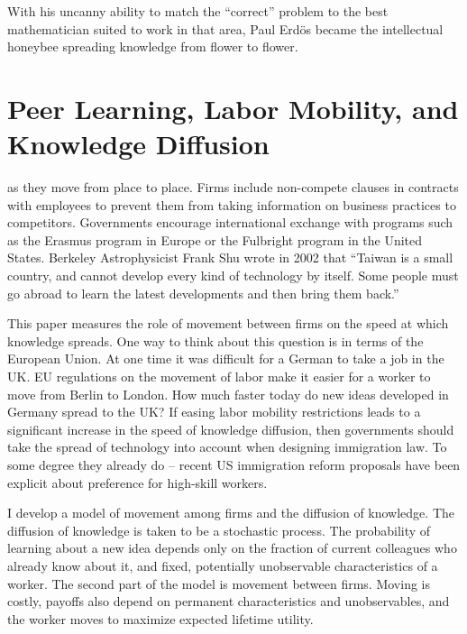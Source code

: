 \begin{savequote}[75mm]
With his uncanny ability to match the “correct” problem to the best mathematician suited to work in that area, Paul Erd{\"o}s became the intellectual honeybee spreading knowledge from flower to flower.
\end{savequote}

\chapter{Peer Learning, Labor Mobility, and Knowledge Diffusion}

 as they move from place to place. Firms include non-compete clauses in contracts with employees to prevent them from
taking information on business practices to competitors. Governments
encourage international exchange with programs such as the Erasmus
program in Europe or the Fulbright program in the United States.
Berkeley Astrophysicist Frank Shu wrote in 2002 that ``Taiwan is a small
country, and cannot develop every kind of technology by itself. Some
people must go abroad to learn the latest developments and then bring
them back.'' \citep{taiwanpanorama2002shu}

This paper measures the role of movement between firms on the speed at
which knowledge spreads. One way to think about this question is in
terms of the European Union. At one time it was difficult for a German
to take a job in the UK. EU regulations on the movement of labor make it
easier for a worker to move from Berlin to London. How much faster
today do new ideas developed in Germany spread to the UK? If easing
labor mobility restrictions leads to a significant increase in the speed
of knowledge diffusion, then governments should take the spread of
technology into account when designing immigration law. To some degree
they already do -- recent US immigration reform proposals have been
explicit about preference for high-skill workers.

I develop a model of movement among firms and the diffusion
of knowledge. The diffusion of knowledge is taken to be a stochastic
process. The probability of learning about a new idea depends only on
the fraction of current colleagues who already know about it, and fixed,
potentially unobservable characteristics of a worker. The second part of
the model is movement between firms. Moving is costly, payoffs also depend on permanent characteristics
and unobservables, and the worker moves to maximize expected lifetime
utility.

